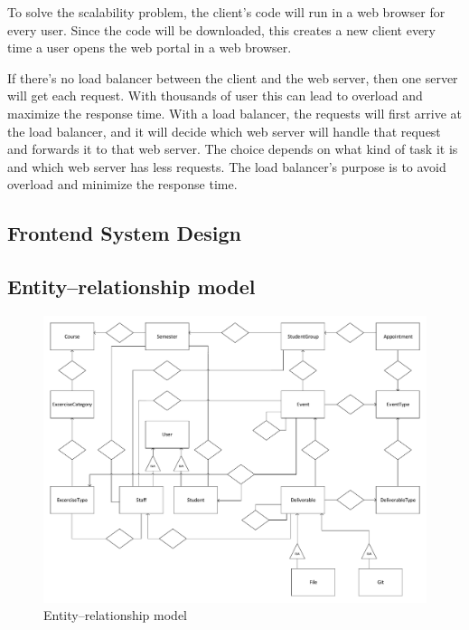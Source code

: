 
To solve the scalability problem, the client's code will run in a web browser for every user. Since the code will be downloaded, this creates a new client every time a user opens the web portal in a web browser.
 

If there's no load balancer between the client and the web server, then one server will get each request. With thousands of user this can lead to overload and maximize the response time. With a load balancer, the requests will first arrive at the load balancer, and it will decide which web server will handle that request and forwards it to that web server. The choice depends on what kind of task it is and which web server has less requests. The load balancer's purpose is to avoid overload and minimize the response time.
 

\subsection{Frontend System Design}

\subsection{Entity–relationship model}
\label{ER-model}

\begin{figure}[!ht]
	\includegraphics[width=\textwidth]{figures/ER.pdf}
	\caption{Entity–relationship model}
	\label{fig:er}
\end{figure}

